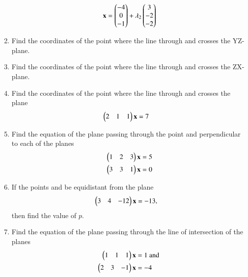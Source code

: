 \begin{enumerate}[label=\arabic*.,ref=\thesubsection.\theenumi]
\begin{align}
\\
\mathbf{x} = \begin{pmatrix}-4 \\ 0 \\ -1\end{pmatrix} + \lambda_2 \begin{pmatrix}3 \\ -2 \\ -2\end{pmatrix}  
\end{align}
%
\item Find the coordinates of the point where the line through  and  crosses the YZ-plane.
\item Find the coordinates of the point where the line through  and  crosses the ZX-plane.
\item Find the coordinates of the point where the line through  and  crosses the plane 
\begin{align}
\begin{pmatrix}2 & 1 & 1\end{pmatrix}\mathbf{x}&=7
\end{align}
%
\item Find the equation of the plane passing through the point  and perpendicular to each of the planes 
\begin{align}
\begin{pmatrix}1 & 2 & 3\end{pmatrix}\mathbf{x}&=5
\\
\begin{pmatrix}3 & 3 & 1\end{pmatrix}\mathbf{x}&=0
\end{align}
\item If the points  and  be equidistant from the plane 
\begin{align}
\begin{pmatrix}3 & 4 & -12\end{pmatrix}\mathbf{x}&=-13,
\end{align}
%
then find the value of $p$.
\item Find the equation of the plane passing through the line of intersection of the planes 
\begin{align}
\myvec{1 & 1 & 1}\vec{x}&=1 \text{ and }
\\
\myvec{2 & 3 & -1}\vec{x}&=-4

\end{align}
\end{enumerate}
